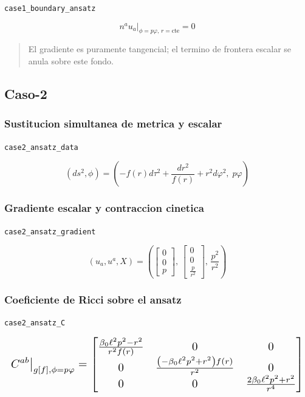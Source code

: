 \documentclass[11pt,a4paper]{article}
\begin{document}
\noindent\texttt{case1\_boundary\_ansatz}\par\nopagebreak[4]

\[
n^au_a\big|_{\phi=p\varphi,\,r=\mathrm{cte}} = 0
\]

\begin{quote}\small El gradiente es puramente tangencial; el termino de frontera escalar se anula sobre este fondo.\end{quote}

\subsection{Caso-2}

\subsubsection{Sustitucion simultanea de metrica y escalar}

\noindent\texttt{case2\_ansatz\_data}\par\nopagebreak[4]

\[
(ds^2,\phi) = \left(-f(r)d\tau^2+\frac{dr^2}{f(r)}+r^2d\varphi^2,\;p\varphi\right)
\]

\subsubsection{Gradiente escalar y contraccion cinetica}

\noindent\texttt{case2\_ansatz\_gradient}\par\nopagebreak[4]

\[
(u_a,u^a,X) = \left(\left[\begin{matrix}0\\0\\p\end{matrix}\right],\,\left[\begin{matrix}0\\0\\\frac{p}{r^{2}}\end{matrix}\right],\,\frac{p^{2}}{r^{2}}\right)
\]

\subsubsection{Coeficiente de Ricci sobre el ansatz}

\noindent\texttt{case2\_ansatz\_C}\par\nopagebreak[4]

\[
\resizebox{\textwidth}{!}{$\displaystyle C^{ab}\big|_{g[f],\phi=p\varphi} = \left[\begin{matrix}\frac{\beta_{0} \ell^{2} p^{2} - r^{2}}{r^{2} f{\left(r \right)}} & 0 & 0\\0 & \frac{\left(- \beta_{0} \ell^{2} p^{2} + r^{2}\right) f{\left(r \right)}}{r^{2}} & 0\\0 & 0 & \frac{2 \beta_{0} \ell^{2} p^{2} + r^{2}}{r^{4}}\end{matrix}\right]$}
\]
\end{document}
